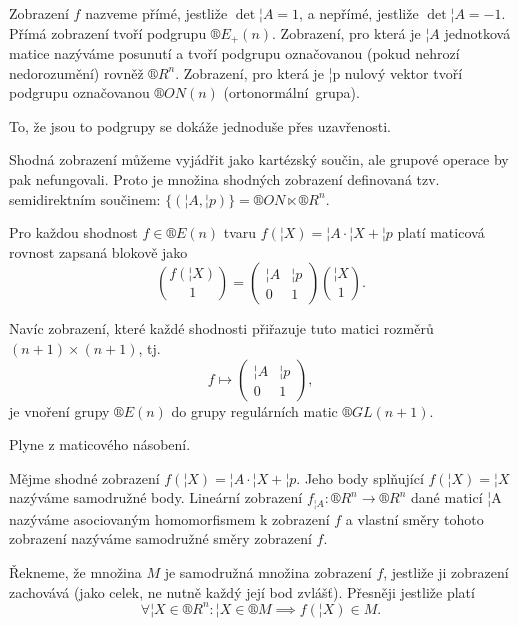 \documentclass[12pt]{article}					%
\begin{document}
\begin{definice}
	Zobrazení $f$ nazveme přímé, jestliže $\det ¦A = 1$, a nepřímé, jestliže $\det ¦A = -1$. Přímá zobrazení tvoří podgrupu $®E_+(n)$. Zobrazení, pro která je $¦A$ jednotková matice nazýváme posunutí a tvoří podgrupu označovanou (pokud nehrozí nedorozumění) rovněž $®R^n$. Zobrazení, pro která je ¦p nulový vektor tvoří podgrupu označovanou $®{ON}(n)$ (ortonormální grupa).

	\begin{dukazin}
		To, že jsou to podgrupy se dokáže jednoduše přes uzavřenosti.
	\end{dukazin}

	\begin{poznamka}
		Shodná zobrazení můžeme vyjádřit jako kartézský součin, ale grupové operace by pak nefungovali. Proto je množina shodných zobrazení definovaná tzv. semidirektním součinem: $\{(¦A, ¦p)\} = ®{ON} \ltimes ®R^n$.
	\end{poznamka}
\end{definice}

\begin{veta}
	Pro každou shodnost $f \in ®E(n)$ tvaru $f(¦X) = ¦A·¦X + ¦p$ platí maticová rovnost zapsaná blokově jako
	$$ \binom{f(¦X)}{1} = \begin{pmatrix} ¦A & ¦p \\ 0 & 1 \end{pmatrix}\binom{¦X}{1}. $$

	Navíc zobrazení, které každé shodnosti přiřazuje tuto matici rozměrů $(n+1) \times (n+1)$, tj.
	$$ f \mapsto \begin{pmatrix} ¦A & ¦p \\ 0 & 1 \end{pmatrix},  $$
	je vnoření grupy $®E(n)$ do grupy regulárních matic $®{GL}(n+1)$.

	\begin{dukazin}
		Plyne z maticového násobení.
	\end{dukazin}
\end{veta}

\begin{definice}
	Mějme shodné zobrazení $f(¦X) = ¦A·¦X + ¦p$. Jeho body splňující $f(¦X) = ¦X$ nazýváme samodružné body. Lineární zobrazení $f_{¦A}: ®R^n \rightarrow ®R^n$ dané maticí ¦A nazýváme asociovaným homomorfismem k zobrazení $f$ a vlastní směry tohoto zobrazení nazýváme samodružné směry zobrazení $f$.

	Řekneme, že množina $M$ je samodružná množina zobrazení $f$, jestliže ji zobrazení zachovává (jako celek, ne nutně každý její bod zvlášť). Přesněji jestliže platí
	$$ \forall ¦X \in ®R^n: ¦X \in ®M \implies f(¦X) \in M. $$
\end{definice}
\end{document}
